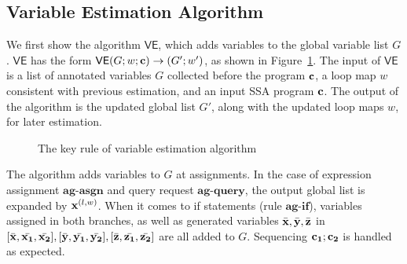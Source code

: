 \subsection{Variable Estimation Algorithm}
We first show the algorithm $\mathsf{VE}$, which adds variables to the global variable list $G$. $\mathsf{VE}$ has the form $\mathsf{VE}{(G; w; {\bf{{c}}})}\to {( G'; w')} $, as shown in Figure~\ref{fig:ag}. The input of $\mathsf{VE}$ is a list of annotated variables $G$ collected before the program ${\bf{{c}}}$, a loop map $w$ consistent with previous estimation, and an input SSA program ${\bf{{c}}}$. The output of the algorithm is the updated global list $G'$, along with the updated loop maps $w$, for later estimation.   
{\footnotesize
\begin{figure}
\vspace{-0.4cm}
 \caption{The key rule of variable estimation algorithm  }
    \label{fig:ag}
    \vspace{-0.5cm}
\end{figure}
}

The algorithm adds variables to $G$ at assignments. In the case of expression assignment $\textbf{ag-asgn}$ and query request $\textbf{ag-query}$, the output global list is expanded by ${\bf{{x}}}^{(l,w)}$. When it comes to if statements (rule $\textbf{ag-if}$), variables assigned in both branches, as well as generated variables $\bar{{\bf{{x}}}},\bar{{\bf{{y}}}},\bar{{\bf{{z}}}}$ in $ [ \bar{{\bf{{x}}}}, \bar{{\bf{{x_1}}}}, \bar{{\bf{{x_2}}}}] ,[ \bar{{\bf{{y}}}}, \bar{{\bf{{y_1}}}}, \bar{{\bf{{y_2}}}}],[ \bar{{\bf{{z}}}}, \bar{{\bf{{z_1}}}}, \bar{{\bf{{z_2}}}}]$ are all added to $G$. Sequencing ${\bf{{c_1;c_2}}}$ is handled as expected.

